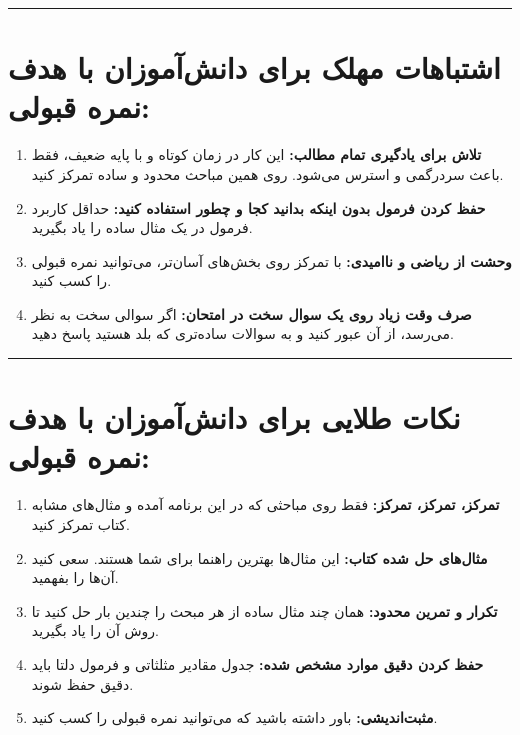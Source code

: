 \documentclass[12pt,a4paper]{article}
\begin{document}
\rule{\linewidth}{0.4pt}\vspace{1em}

\section*{اشتباهات مهلک برای دانش‌آموزان با هدف نمره قبولی:}
\begin{enumerate}[label=\arabic*., itemsep=0.2em, topsep=0.3em]
    \item \textbf{تلاش برای یادگیری تمام مطالب:} این کار در زمان کوتاه و با پایه ضعیف، فقط باعث سردرگمی و استرس می‌شود. روی همین مباحث محدود و ساده تمرکز کنید.
    \item \textbf{حفظ کردن فرمول بدون اینکه بدانید کجا و چطور استفاده کنید:} حداقل کاربرد فرمول در یک مثال ساده را یاد بگیرید.
    \item \textbf{وحشت از ریاضی و ناامیدی:} با تمرکز روی بخش‌های آسان‌تر، می‌توانید نمره قبولی را کسب کنید.
    \item \textbf{صرف وقت زیاد روی یک سوال سخت در امتحان:} اگر سوالی سخت به نظر می‌رسد، از آن عبور کنید و به سوالات ساده‌تری که بلد هستید پاسخ دهید.
\end{enumerate}

\vspace{1em}
\rule{\linewidth}{0.4pt}\vspace{1em}

\section*{نکات طلایی برای دانش‌آموزان با هدف نمره قبولی:}
\begin{enumerate}[label=\arabic*., itemsep=0.2em, topsep=0.3em]
    \item \textbf{تمرکز، تمرکز، تمرکز:} فقط روی مباحثی که در این برنامه آمده و مثال‌های مشابه کتاب تمرکز کنید.
    \item \textbf{مثال‌های حل شده کتاب:} این مثال‌ها بهترین راهنما برای شما هستند. سعی کنید آن‌ها را بفهمید.
    \item \textbf{تکرار و تمرین محدود:} همان چند مثال ساده از هر مبحث را چندین بار حل کنید تا روش آن را یاد بگیرید.
    \item \textbf{حفظ کردن دقیق موارد مشخص شده:} جدول مقادیر مثلثاتی و فرمول دلتا باید دقیق حفظ شوند.
    \item \textbf{مثبت‌اندیشی:} باور داشته باشید که می‌توانید نمره قبولی را کسب کنید.
\end{enumerate}
\end{document}
